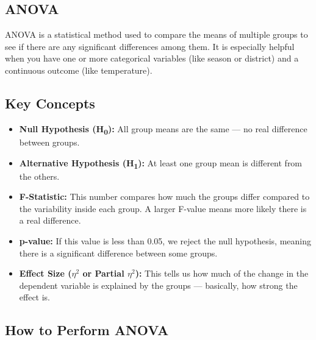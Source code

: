 \subsection{ANOVA}

ANOVA is a statistical method used to compare the means of multiple groups to see if there are any significant differences among them. It is especially helpful when you have one or more categorical variables (like season or district) and a continuous outcome (like temperature).

\subsection*{Key Concepts}

\begin{itemize}
    \item \textbf{Null Hypothesis (H\textsubscript{0}):} All group means are the same — no real difference between groups.
    
    \item \textbf{Alternative Hypothesis (H\textsubscript{1}):} At least one group mean is different from the others.
    
    \item \textbf{F-Statistic:} This number compares how much the groups differ compared to the variability inside each group. A larger F-value means more likely there is a real difference.
    
    \item \textbf{p-value:} If this value is less than 0.05, we reject the null hypothesis, meaning there is a significant difference between some groups.
    
    \item \textbf{Effect Size ($\eta^2$ or Partial $\eta^2$):} This tells us how much of the change in the dependent variable is explained by the groups — basically, how strong the effect is.

\end{itemize}

\subsection*{How to Perform ANOVA}


